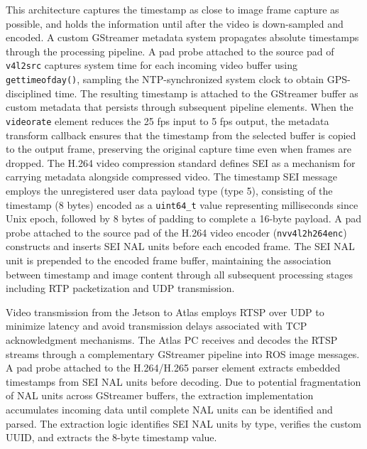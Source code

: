 \documentclass{erauthesis}
\begin{document}
This architecture captures the timestamp as close to image frame capture as possible, and holds the information until after the video is down-sampled and encoded.
A custom GStreamer metadata system propagates absolute timestamps through the processing pipeline. A pad probe attached to the source pad of \texttt{v4l2src} captures system time for each incoming video buffer using \texttt{gettimeofday()}, sampling the \ac{NTP}-synchronized system clock to obtain GPS-disciplined time. The resulting timestamp is attached to the GStreamer buffer as custom metadata that persists through subsequent pipeline elements. When the \texttt{videorate} element reduces the 25 fps input to 5 fps output, the metadata transform callback ensures that the timestamp from the selected buffer is copied to the output frame, preserving the original capture time even when frames are dropped.
The H.264 video compression standard defines \ac{SEI} as a mechanism for carrying metadata alongside compressed video. 
The timestamp \ac{SEI} message employs the unregistered user data payload type (type 5), consisting of the timestamp (8 bytes) encoded as a \texttt{uint64\_t} value representing milliseconds since Unix epoch, followed by 8 bytes of padding to complete a 16-byte payload. 
A pad probe attached to the source pad of the H.264 video encoder (\texttt{nvv4l2h264enc}) constructs and inserts \ac{SEI} \ac{NAL} units before each encoded frame.  
The \ac{SEI} \ac{NAL} unit is prepended to the encoded frame buffer, maintaining the association between timestamp and image content through all subsequent processing stages including \ac{RTP} packetization and \ac{UDP} transmission.

Video transmission from the Jetson to Atlas employs \ac{RTSP} over \ac{UDP} to minimize latency and avoid transmission delays associated with TCP acknowledgment mechanisms. The Atlas PC receives and decodes the \ac{RTSP} streams through a complementary GStreamer pipeline into ROS image messages. A pad probe attached to the H.264/H.265 parser element extracts embedded timestamps from \ac{SEI} \ac{NAL} units before decoding. Due to potential fragmentation of \ac{NAL} units across GStreamer buffers, the extraction implementation accumulates incoming data until complete \ac{NAL} units can be identified and parsed. The extraction logic identifies \ac{SEI} \ac{NAL} units by type, verifies the custom UUID, and extracts the 8-byte timestamp value.
\end{document}
